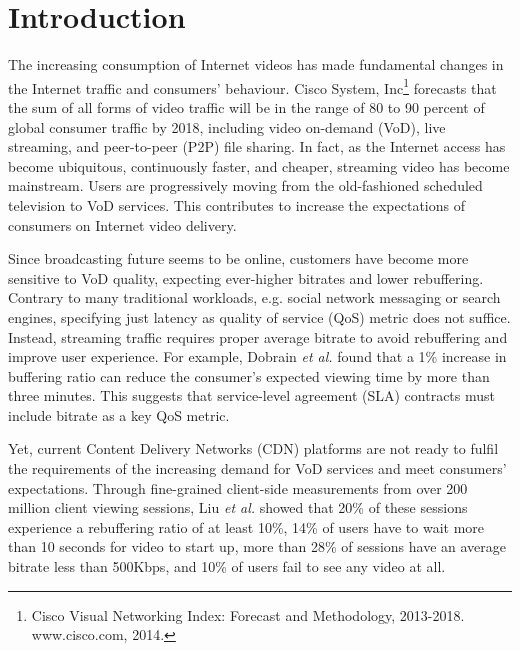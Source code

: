 \section{Introduction}

The increasing consumption of Internet videos has made fundamental changes in the Internet traffic and consumers' behaviour. Cisco System, Inc\footnote{Cisco Visual Networking Index: Forecast and Methodology, 2013-2018. www.cisco.com, 2014.} forecasts that the sum of all forms of video traffic will be in the range of 80 to 90 percent of global consumer traffic by 2018, including video on-demand (VoD), live streaming, and peer-to-peer (P2P) file sharing. In fact, as the Internet access has become ubiquitous, continuously faster, and cheaper, streaming video has become mainstream. Users are progressively moving from the old-fashioned scheduled television to VoD services. This contributes to increase the expectations of consumers on Internet video delivery. 

Since broadcasting future seems to be online, customers have become more sensitive to VoD quality, expecting ever-higher bitrates and lower rebuffering. Contrary to many traditional workloads, e.g. social network messaging or search engines, specifying just latency as quality of service (QoS) metric does not suffice. Instead, streaming traffic requires proper average bitrate to avoid rebuffering and improve user experience. For example, Dobrain \emph{et al.}\cite{Dobrian_sigcomm_2011} found that a 1\% increase in buffering ratio can reduce the consumer's expected viewing time by more than three minutes. This suggests that service-level agreement (SLA) contracts must include bitrate as a key QoS metric. 

Yet, current Content Delivery Networks (CDN) platforms are not ready to fulfil the requirements of the increasing demand for VoD services and meet consumers' expectations. Through fine-grained client-side measurements from over 200 million client viewing sessions, Liu \emph{et al.}\cite{Liu_sigcomm_2012} showed that 20\% of these sessions experience a rebuffering ratio of at least 10\%, 14\% of users have to wait more than 10 seconds for video to start up, more than 28\% of sessions have an average bitrate less than 500Kbps, and 10\% of users fail to see any video at all.

